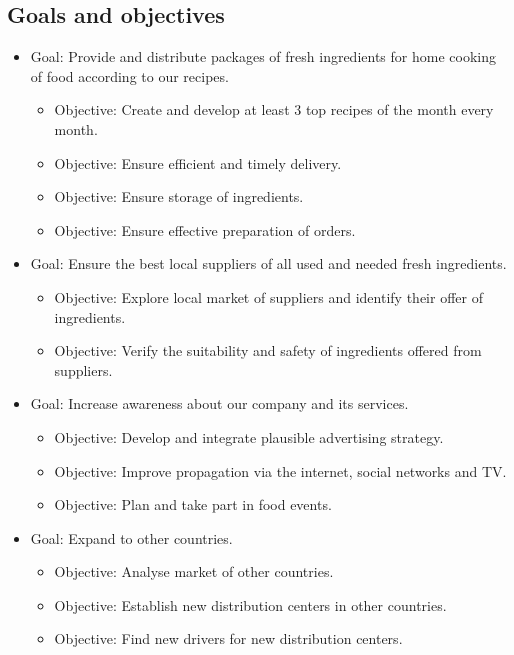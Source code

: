 \documentclass[11pt,a4paper]{article}
\begin{document}
\subsection{Goals and objectives}
\begin{itemize}
    \item Goal: Provide and distribute packages of fresh ingredients for home cooking of food according to our recipes.
    \begin{itemize}
        \item Objective: Create and develop at least 3 top recipes of the month every month.
        \item Objective: Ensure efficient and timely delivery.
        \item Objective: Ensure storage of ingredients.
        \item Objective: Ensure effective preparation of orders.
    \end{itemize}
    \item Goal: Ensure the best local suppliers of all used and needed fresh ingredients.
    \begin{itemize}
        \item Objective: Explore local market of suppliers and identify their offer of ingredients.
        \item Objective: Verify the suitability and safety of ingredients offered from suppliers.
    \end{itemize}
    \item Goal: Increase awareness about our company and its services.
    \begin{itemize}
        \item Objective: Develop and integrate plausible advertising strategy.
        \item Objective: Improve propagation via the internet, social networks and TV.
        \item Objective: Plan and take part in food events.
    \end{itemize}
    \item Goal: Expand to other countries.
    \begin{itemize}
        \item Objective: Analyse market of other countries.
        \item Objective: Establish new distribution centers in other countries.
        \item Objective: Find new drivers for new distribution centers.
    \end{itemize}
\end{itemize}
\end{document}
